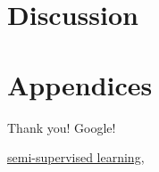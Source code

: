 \documentclass[fleqn,10pt]{SelfArx} %
\begin{document}
\section{Discussion}

\section{Appendices}

Thank you! Google!

\begin{thebibliography}{1}
\href{http://scikit-learn.org/stable/modules/generated/sklearn.semi\_supervised.LabelSpreading.html}{semi-supervised learning,}
\end{thebibliography}

\end{document}
